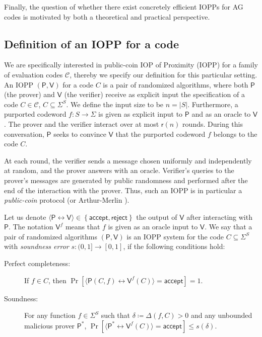 \documentclass[a4paper,USenglish,autoref]{lipics-v2021}
\newcommand\prover{\mathsf{P}}
\newcommand\verifier{\mathsf{V}}
\newcommand{\set}[1]{\left\{#1\right\}}
\newcommand{\size}[1]{\left|#1\right|}
\newcommand\mydef{\coloneqq}
\begin{document}
Finally, the question of whether there exist concretely efficient IOPPs for AG codes is motivated by both a theoretical and practical perspective. 

\subsection{Definition of an IOPP for a code}\label{subsec:def-iopp}

We are specifically interested in public-coin IOP of Proximity (IOPP) for a family of evaluation codes $\mathscr{C}$, thereby we specify our definition for this particular setting. An IOPP  $(\prover, \verifier)$ for a code $C$ is a pair of randomized algorithms, where both $\prover$ (the prover) and $\verifier$ (the verifier) receive as explicit input the specification of a code $C \in \mathscr{C}$, $C \subseteq \Sigma^S$. We define the input size to be $n = \size{S}$. Furthermore, a purported codeword $f : S \rightarrow \Sigma$ is given as explicit input to $\prover$ and as an oracle to $\verifier$. The prover and the verifier interact over at most $\mathsf{r}(n)$ rounds. During this conversation, $\prover$ seeks to convince $\verifier$ that the purported codeword $f$ belongs to the code $C$. 

At each round, the verifier sends a message chosen uniformly and independently at random, and the prover answers with an oracle. Verifier's queries to the prover's messages are generated by public randomness and performed after the end of the interaction with the prover. Thus, such an IOPP is in particular a \emph{public-coin} protocol (or Arthur-Merlin \cite{Bab85}). 

Let us denote $\langle \prover \leftrightarrow \verifier \rangle \in \set{\textsf{accept}, \textsf{reject}}$ the output of $\verifier$ after interacting with $\prover$. The notation $\verifier^f$ means that $f$ is given as an oracle input to $\verifier$. We say that a pair of randomized algorithms $(\prover, \verifier)$ is an IOPP system for the code $C \subseteq \Sigma^S$ with \emph{soundness error} $s : (0,1] \rightarrow [0,1]$, if the following conditions hold:

\begin{description}
	\item[Perfect completeness:] If $f \in C$, then $\Pr[\langle \prover (C, f)\leftrightarrow \verifier^{f}(C) \rangle = \textsf{accept}] = 1$.
	\item[Soundness:] For any function $f \in \Sigma^S$ such that $\delta \mydef \Delta(f, C) > 0$ and any unbounded malicious prover $ \prover^*$, $\Pr[\langle \prover^* \leftrightarrow \verifier^{f}(C) \rangle = \textsf{accept}] \leq s(\delta).$
\end{description}
\end{document}
